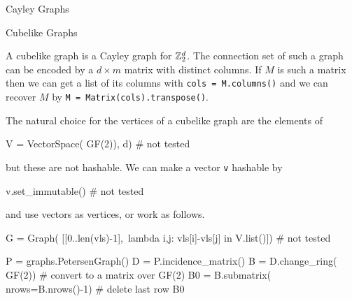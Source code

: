 \begin{chap}{Cayley Graphs}
\begin{sect}{Cubelike Graphs}
%
\begin{para}
A cubelike graph is a Cayley graph for ${\mathbb Z}_2^d$. The connection
set of such a graph can be encoded by a $d\times m$ matrix with distinct
columns. If $M$ is such a matrix then we can get a list of its columns with \verb|cols = M.columns()| and we can recover $M$ by \verb|M = Matrix(cols).transpose()|.
\end{para}
%
\begin{para}
The natural choice for the vertices of a cubelike graph are the elements of
\end{para}
%
\begin{sagecode}
\begin{sageinput}
V = VectorSpace( GF(2)), d)  # not tested
\end{sageinput}
\end{sagecode}
%
\begin{para}
but these are not hashable. We can make a vector \verb|v| hashable by
\end{para}
%
\begin{sagecode}
\begin{sageinput}
v.set_immutable() # not tested
\end{sageinput}
\end{sagecode}
%
\begin{para}
and use vectors as vertices, or work as follows.
\end{para}
%
\begin{sagecode}
\begin{sageinput}
G = Graph( [[0..len(vls)-1],\
    lambda i,j: vls[i]-vls[j] in V.list()]) # not tested
\end{sageinput}
\end{sagecode}
%
\begin{sagecode}
\begin{sageinput}
P = graphs.PetersenGraph()
D = P.incidence_matrix()
B = D.change_ring( GF(2))  # convert to a matrix over GF(2)
B0 = B.submatrix( nrows=B.nrows()-1)  # delete last row
B0
\end{sageinput}
\begin{sageoutput}
[1 1 1 0 0 0 0 0 0 0 0 0 0 0 0]
[0 0 1 1 1 0 0 0 0 0 0 0 0 0 0]
[0 0 0 0 1 1 1 0 0 0 0 0 0 0 0]
[0 0 0 0 0 0 1 1 1 0 0 0 0 0 0]
[0 1 0 0 0 0 0 0 1 1 0 0 0 0 0]
[1 0 0 0 0 0 0 0 0 0 1 1 0 0 0]
[0 0 0 1 0 0 0 0 0 0 0 0 1 1 0]
[0 0 0 0 0 1 0 0 0 0 0 1 0 0 1]
[0 0 0 0 0 0 0 1 0 0 1 0 0 1 0]
\end{sageoutput}
\end{sagecode}
%
\begin{para}

\end{para}
\end{sect}
\end{chap}
